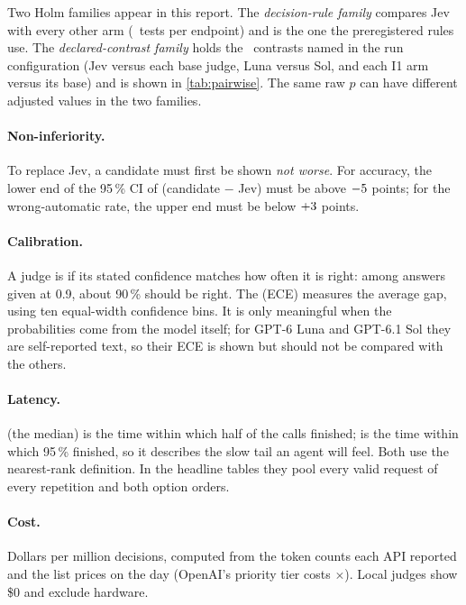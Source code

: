 Two Holm families appear in this report. The \emph{decision-rule family} compares Jev with every other
arm (\RuleOneFamilyHold\ tests per endpoint) and is the one the preregistered rules use. The
\emph{declared-contrast family} holds the \HoldPairwiseFamily\ contrasts named in the run configuration
(Jev versus each base judge, Luna versus Sol, and each I1 arm versus its base) and is shown in
\cref{tab:pairwise}. The same raw $p$ can have different adjusted values in the two families.

\paragraph{Non-inferiority.} To replace Jev, a candidate must first be shown \emph{not worse}. For
accuracy, the lower end of the 95\,\% CI of (candidate $-$ Jev) must be above $-5$ points;
for the wrong-automatic rate, the upper end must be below $+3$ points.

\paragraph{Calibration.} A judge is  if its stated confidence matches how often it is
right: among answers given at 0.9, about 90\,\% should be right. The 
(ECE) measures the average gap, using ten equal-width confidence bins. It is only meaningful when the
probabilities come from the model itself; for GPT-6 Luna and GPT-6.1 Sol they are self-reported text,
so their ECE is shown but should not be compared with the others.

\paragraph{Latency.}  (the median) is the time within which half of the calls finished;
 is the time within which 95\,\% finished, so it describes the slow tail an agent will feel.
Both use the nearest-rank definition. In the headline tables they pool every valid request of every
repetition and both option orders.

\paragraph{Cost.} Dollars per million decisions, computed from the token counts each API reported and
the list prices on the day (OpenAI's priority tier costs \PriorityMultiplier$\times$). Local judges
show \$0 and exclude hardware.

